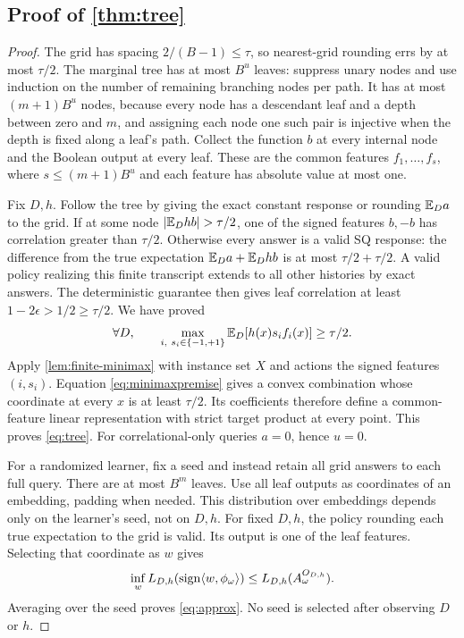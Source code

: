 \subsection[Proof of result tree]{Proof of \cref{thm:tree}}\label{proof:tree}
\begin{proof}
The grid has spacing $2/(B-1)\leq\tau$, so nearest-grid rounding errs by at most $\tau/2$. The marginal tree has at most $B^u$ leaves: suppress unary nodes and use induction on the number of remaining branching nodes per path. It has at most $(m+1)B^u$ nodes, because every node has a descendant leaf and a depth between zero and $m$, and assigning each node one such pair is injective when the depth is fixed along a leaf's path.
Collect the function $b$ at every internal node and the Boolean output at every leaf. These are the common features $f_1,\ldots,f_s$, where $s\leq(m+1)B^u$ and each feature has absolute value at most one.

Fix $D,h$. Follow the tree by giving the exact constant response or rounding $\mathbb E_Da$ to the grid. If at some node $|\E_D hb|>\tau/2$, one of the signed features $b,-b$ has correlation greater than $\tau/2$. Otherwise every answer is a valid SQ response: the difference from the true expectation $\mathbb E_Da+\mathbb E_D hb$ is at most $\tau/2+\tau/2$. A valid policy realizing this finite transcript extends to all other histories by exact answers. The deterministic guarantee then gives leaf correlation at least $1-2\epsilon>1/2\geq\tau/2$. We have proved
\begin{equation}\label{eq:minimaxpremise}
 \forall D,\qquad \max_{i,\ s_i\in\{-1,+1\}}\E_D[h(x)s_if_i(x)]\geq\tau/2.
\end{equation}
Apply \cref{lem:finite-minimax} with instance set $X$ and actions the signed features $(i,s_i)$. Equation \eqref{eq:minimaxpremise} gives a convex combination whose coordinate at every $x$ is at least $\tau/2$. Its coefficients therefore define a common-feature linear representation with strict target product at every point. This proves \eqref{eq:tree}. For correlational-only queries $a=0$, hence $u=0$.

For a randomized learner, fix a seed and instead retain all grid answers to each full query. There are at most $B^m$ leaves. Use all leaf outputs as coordinates of an embedding, padding when needed. This distribution over embeddings depends only on the learner's seed, not on $D,h$. For fixed $D,h$, the policy rounding each true expectation to the grid is valid. Its output is one of the leaf features. Selecting that coordinate as $w$ gives
\[
 \inf_w L_{D,h}(\operatorname{sign}\langle w,\phi_\omega\rangle)
 \leq L_{D,h}(A_\omega^{O_{D,h}}).
\]
Averaging over the seed proves \eqref{eq:approx}. No seed is selected after observing $D$ or $h$.
\end{proof}

